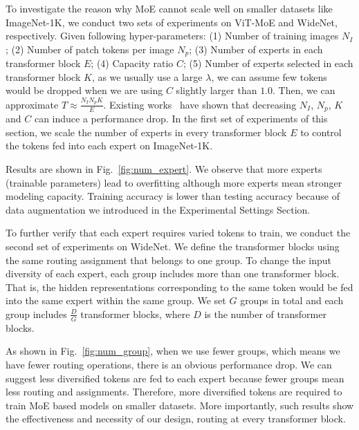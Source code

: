 \documentclass[letterpaper]{article} \usepackage{aaai22}  \usepackage{times}  \usepackage{helvet}  \usepackage{courier}  \usepackage[hyphens]{url}  \usepackage{graphicx} \urlstyle{rm} \def\UrlFont{\rm}  \usepackage{natbib}  \usepackage{caption} \DeclareCaptionStyle{ruled}{labelfont=normalfont,labelsep=colon,strut=off} \frenchspacing  \setlength{\pdfpagewidth}{8.5in}  \setlength{\pdfpageheight}{11in}  \usepackage{algorithm}
\begin{document}
To investigate the reason why MoE cannot scale well on smaller datasets like ImageNet-1K, we conduct two sets of experiments on ViT-MoE and WideNet, respectively. Given following hyper-parameters: (1) Number of training images $N_I$; (2) Number of patch tokens per image $N_p$; (3) Number of experts in each transformer block $E$; (4) Capacity ratio $C$; (5) Number of experts selected in each transformer block $K$, as we usually use a large $\lambda$, we can assume few tokens would be dropped when we are using $C$ slightly larger than $1.0$. Then, we can approximate $T \approx \frac{N_I N_p K}{E}$. Existing works~\citep{riquelme2021scaling,yang2021exploring} have shown that decreasing $N_I$, $N_p$, $K$ and $C$ can induce a performance drop. In the first set of experiments of this section, we scale the number of experts in every transformer block $E$ to control the tokens fed into each expert on ImageNet-1K.















Results are shown in Fig.~\ref{fig:num_expert}. We observe that more experts (trainable parameters) lead to overfitting although more experts mean stronger modeling capacity. Training accuracy is lower than testing accuracy because of data augmentation we introduced in the Experimental Settings Section.





To further verify that each expert requires varied tokens to train, we conduct the second set of experiments on WideNet. We define the transformer blocks using the same routing assignment that belongs to one group. To change the input diversity of each expert, each group includes more than one transformer block. That is, the hidden representations corresponding to the same token would be fed into the same expert within the same group. We set $G$ groups in total and each group includes $\frac{D}{G}$ transformer blocks, where $D$ is the number of transformer blocks.  

As shown in Fig.~\ref{fig:num_group}, when we use fewer groups, which means we have fewer routing operations, there is an obvious performance drop. We can suggest less diversified tokens are fed to each expert because fewer groups mean less routing and assignments. Therefore, more diversified tokens are required to train MoE based models on smaller datasets. More importantly, such results show the effectiveness and necessity of our design, routing at every transformer block.
\end{document}
